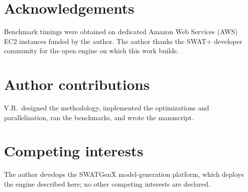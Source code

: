\documentclass[12pt]{article}
\begin{document}
\section*{Acknowledgements}
Benchmark timings were obtained on dedicated Amazon Web Services (AWS) EC2 instances funded by the
author. The author thanks the SWAT+ developer community for the open engine on which this work
builds.

\section*{Author contributions}
V.R.\ designed the methodology, implemented the optimizations and parallelization, ran the
benchmarks, and wrote the manuscript.

\section*{Competing interests}
The author develops the SWATGenX model-generation platform, which deploys the engine described here;
no other competing interests are declared.



\end{document}
